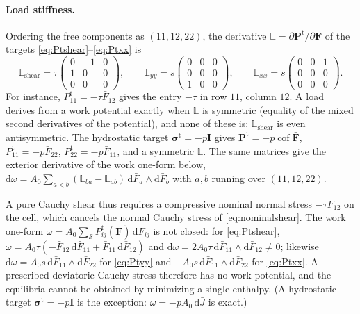 \documentclass[11pt,a4paper]{article}
\newcommand{\Fb}{\bar{\mathbf F}}
\newcommand{\Pt}{\mathbf P^{\mathrm t}}
\newcommand{\sigt}{\bm\sigma^{\mathrm t}}
\newcommand{\I}{\mathbf I}
\begin{document}
\paragraph{Load stiffness.}
Ordering the free components as \((11,12,22)\), the derivative \(\mathbb L=\partial\Pt/\partial\Fb\)
of the targets \eqref{eq:Ptshear}--\eqref{eq:Ptxx} is
\begin{equation}
  \mathbb L_{\text{shear}}=\tau\begin{pmatrix}0&-1&0\\1&0&0\\0&0&0\end{pmatrix},\qquad
  \mathbb L_{yy}=s\begin{pmatrix}0&0&0\\0&0&0\\1&0&0\end{pmatrix},\qquad
  \mathbb L_{xx}=s\begin{pmatrix}0&0&1\\0&0&0\\0&0&0\end{pmatrix}.
  \label{eq:Lload}
\end{equation}
For instance, \(P^{\mathrm t}_{11}=-\tau\bar F_{12}\) gives the entry \(-\tau\) in row \(11\), column
\(12\). A load derives from a work potential exactly when \(\mathbb L\) is symmetric (equality of the
mixed second derivatives of the potential), and none of these is: \(\mathbb L_{\text{shear}}\) is even
antisymmetric. The hydrostatic target \(\sigt=-p\I\) gives \(\Pt=-p\operatorname{cof}\Fb\),
\(P^{\mathrm t}_{11}=-p\bar F_{22}\), \(P^{\mathrm t}_{22}=-p\bar F_{11}\), and a symmetric \(\mathbb L\).
The same matrices give the exterior derivative of the work one-form below,
\(\mathrm d\omega=A_0\sum_{a<b}(\mathbb L_{ba}-\mathbb L_{ab})\,\mathrm d\bar F_a\wedge\mathrm d\bar F_b\)
with \(a,b\) running over \((11,12,22)\).

A pure Cauchy shear thus requires a compressive nominal normal stress \(-\tau\bar F_{12}\) on the
cell, which cancels the normal Cauchy stress of \eqref{eq:nominalshear}. The work one-form
\(\omega=A_0\sum_{\mathcal S}P^{\mathrm t}_{ij}(\Fb)\,\mathrm d\bar F_{ij}\) is not closed:
for \eqref{eq:Ptshear}, \(\omega=A_0\tau(-\bar F_{12}\,\mathrm d\bar F_{11}+\bar F_{11}\,\mathrm d\bar F_{12})\)
and \(\mathrm d\omega=2A_0\tau\,\mathrm d\bar F_{11}\wedge\mathrm d\bar F_{12}\neq0\); likewise
\(\mathrm d\omega=A_0 s\,\mathrm d\bar F_{11}\wedge\mathrm d\bar F_{22}\) for \eqref{eq:Ptyy} and
\(-A_0 s\,\mathrm d\bar F_{11}\wedge\mathrm d\bar F_{22}\) for \eqref{eq:Ptxx}. A prescribed
deviatoric Cauchy stress therefore has no work potential, and the equilibria cannot be obtained by
minimizing a single enthalpy. (A hydrostatic target \(\sigt=-p\I\) is the exception:
\(\omega=-pA_0\,\mathrm d\bar J\) is exact.)
\end{document}
